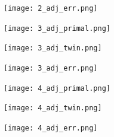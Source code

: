 \documentclass{paper1}
\begin{document}
\begin{figure}
\begin{subfigure}[b]{.95\textwidth}
          \begin{subfigure}[b]{0.32\textwidth}
                  \centering
                  \texttt{[image: 2\_adj\_err.png]}
          \end{subfigure}%
    \end{subfigure}
    \begin{subfigure}[b]{.95\textwidth}
          \centering
          \begin{subfigure}[b]{0.32\textwidth}
                  \centering
                  \texttt{[image: 3\_adj\_primal.png]}
          \end{subfigure}%
          \begin{subfigure}[b]{0.32\textwidth}
                  \centering
                  \texttt{[image: 3\_adj\_twin.png]}
          \end{subfigure}
          \begin{subfigure}[b]{0.32\textwidth}
                  \centering
                  \texttt{[image: 3\_adj\_err.png]}
          \end{subfigure}
    \end{subfigure}
    \begin{subfigure}[b]{.95\textwidth}
          \centering
          \begin{subfigure}[b]{0.32\textwidth}
                  \centering
                  \texttt{[image: 4\_adj\_primal.png]}
          \end{subfigure}%
          \begin{subfigure}[b]{0.32\textwidth}
                  \centering
                  \texttt{[image: 4\_adj\_twin.png]}
          \end{subfigure}
          \begin{subfigure}[b]{0.32\textwidth}
                  \centering
                  \texttt{[image: 4\_adj\_err.png]}
          \end{subfigure}%
    \end{subfigure}
\end{figure}
\end{document}
